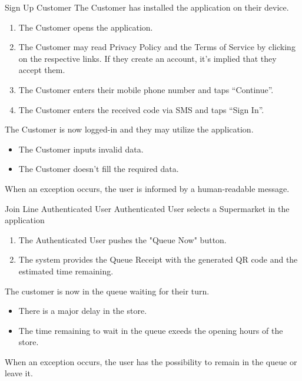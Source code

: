 \usecase
{Sign Up}
{Customer}
{The Customer has installed the application on their device.}
{
    \begin{enumerate}
        \item The Customer opens the application.
        \item The Customer may read Privacy Policy and the Terms of Service by clicking on the respective links. If they create an account, it's implied that they accept them.
        \item The Customer enters their mobile phone number and taps ``Continue''.
        \item The Customer enters the received code via SMS and taps ``Sign In''.
    \end{enumerate}
}
{The Customer is now logged-in and they may utilize the application.}
{
    \begin{itemize}
        \item The Customer inputs invalid data.
        \item The Customer doesn't fill the required data.
    \end{itemize}
}
{
    When an exception occurs, the user is informed by a human-readable message.
}


\usecase
{Join Line}
{Authenticated User}
{Authenticated User selects a Supermarket in the application}
{
        \begin{enumerate}
            \item The Authenticated User pushes the "Queue Now" button.
            \item The system provides the Queue Receipt with the generated QR code and the estimated time remaining.
        \end{enumerate}
}
{
    The customer is now in the queue waiting for their turn.
}
{
    \begin{itemize}
        \item There is a major delay in the store. 
        \item The time remaining to wait in the queue exeeds the opening hours of the store. 
    \end{itemize}
}
{
    When an exception occurs, the user has the possibility to remain in the queue or leave it. 
}


